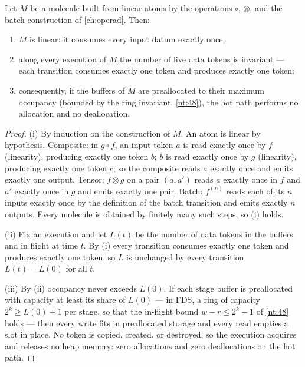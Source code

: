 \begin{theorem}\label{nt:50}
Let $M$ be a molecule built from linear atoms by the operations $\circ$, $\otimes$, and the batch construction of \autoref{ch:operad}. Then:
\begin{enumerate}
\item $M$ is linear: it consumes every input datum exactly once;
\item along every execution of $M$ the number of live data tokens is invariant --- each transition consumes exactly one token and produces exactly one token;
\item consequently, if the buffers of $M$ are preallocated to their maximum occupancy (bounded by the ring invariant, \autoref{nt:48}), the hot path performs no allocation and no deallocation.
\end{enumerate}
\end{theorem}

\begin{proof}
(i) By induction on the construction of $M$. An atom is linear by hypothesis. Composite: in $g \circ f$, an input token $a$ is read exactly once by $f$ (linearity), producing exactly one token $b$; $b$ is read exactly once by $g$ (linearity), producing exactly one token $c$; so the composite reads $a$ exactly once and emits exactly one output. Tensor: $f \otimes g$ on a pair $(a, a')$ reads $a$ exactly once in $f$ and $a'$ exactly once in $g$ and emits exactly one pair. Batch: $f^{(n)}$ reads each of its $n$ inputs exactly once by the definition of the batch transition and emits exactly $n$ outputs. Every molecule is obtained by finitely many such steps, so (i) holds.

(ii) Fix an execution and let $L(t)$ be the number of data tokens in the buffers and in flight at time $t$. By (i) every transition consumes exactly one token and produces exactly one token, so $L$ is unchanged by every transition: $L(t) = L(0)$ for all $t$.

(iii) By (ii) occupancy never exceeds $L(0)$. If each stage buffer is preallocated with capacity at least its share of $L(0)$ --- in FDS, a ring of capacity $2^k \geq L(0) + 1$ per stage, so that the in-flight bound $w - r \leq 2^k - 1$ of \autoref{nt:48} holds --- then every write fits in preallocated storage and every read empties a slot in place. No token is copied, created, or destroyed, so the execution acquires and releases no heap memory: zero allocations and zero deallocations on the hot path.
\end{proof}

